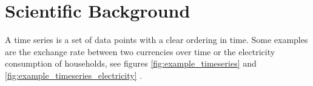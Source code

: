\chapter{Scientific Background}
\label{cha:chapter2}






A time series is a set of data points with a clear ordering in time. Some examples are the exchange rate between two currencies over time or the electricity consumption of households, see figures \ref{fig:example_timeseries} and \ref{fig:example_timeseries_electricity} \cite{gluonts_paper}.

